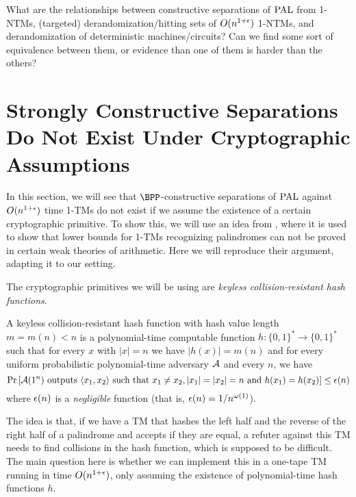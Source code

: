 \begin{question}
    What are the relationships between constructive separations of $\mathrm{PAL}$ from 1-NTMs, (targeted) derandomization/hitting sets
    of $O(n^{1+\epsilon})$ 1-NTMs, and derandomization of deterministic machines/circuits? 
    Can we find some sort of equivalence between them, or evidence than one of them is harder than the others? 
\end{question}




\section{Strongly Constructive Separations Do Not Exist Under Cryptographic Assumptions}
\label{sec:cryptotm}

In this section, we will see that $\BPP$-constructive separations of $\mathrm{PAL}$ against $O(n^{1+\epsilon})$ time 1-TMs do not exist if we assume
the existence of a certain cryptographic primitive. To show this, we will use an idea from \cite{Oliveira24}, where it is used 
to show that lower bounds for 1-TMs recognizing palindromes can not be proved in certain weak theories of arithmetic. Here we 
will reproduce their argument, adapting it to our setting.

The cryptographic primitives we will be using are \emph{keyless collision-resistant hash functions}.

\begin{definition} A keyless collision-resistant hash
function with hash value length $m = m(n) < n$ is a polynomial-time computable
function $h \colon \{0, 1\}^* \to \{0, 1\}^*$ such that for every $x$ with $|x| = n$ we have $|h(x)| = m(n)$
and for every uniform probabilistic polynomial-time adversary
$\mathcal{A}$ and every $n$, we have
$$\text{Pr}\left[\mathcal{A}(1^n)  \text{ outputs } \langle x_1, x_2 \rangle \text{ such that } x_1 \neq x_2, |x_1| = |x_2| = n \text{ and } h(x_1) = h(x_2)\right] \leq \epsilon(n)$$ 
where $\epsilon(n)$ is a \emph{negligible} function (that is, $\epsilon(n) = 1/n^{\omega(1)}$).
\end{definition}

The idea is that, if we have a TM that hashes the left half and the reverse of the right half of a palindrome and accepts if they are equal, a
refuter against this TM needs to find collisions in the hash function, which is supposed to be difficult. The main question here is whether
we can implement this in a one-tape TM running in time $O(n^{1+\epsilon})$, only assuming the existence of polynomial-time hash functions $h$.

